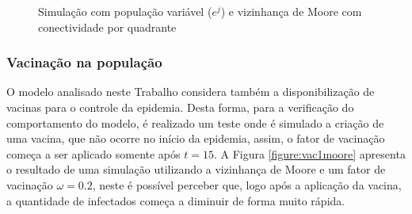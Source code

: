 \documentclass[a4paper,12pt]{article}
\begin{document}
\begin{figure}[!ht]
\qquad
{}
\qquad
{}
\caption{Simulação com população variável ($e^j$) e vizinhança de Moore com conectividade por quadrante}
\label{figure:exp3moore}
\end{figure}

\subsubsection{Vacinação na população}

O modelo analisado neste Trabalho considera também a disponibilização de vacinas para o controle da epidemia. Desta forma, para a verificação do comportamento do modelo, é realizado um teste onde é simulado a criação de uma vacina, que não ocorre no início da epidemia, assim, o fator de vacinação começa a ser aplicado somente após $t = 15$. A Figura \ref{figure:vac1moore} apresenta o resultado de uma simulação utilizando a vizinhança de Moore e um fator de vacinação $\omega = 0.2$, neste é possível perceber que, logo após a aplicação da vacina, a quantidade de infectados começa a diminuir de forma muito rápida. 
\end{document}
